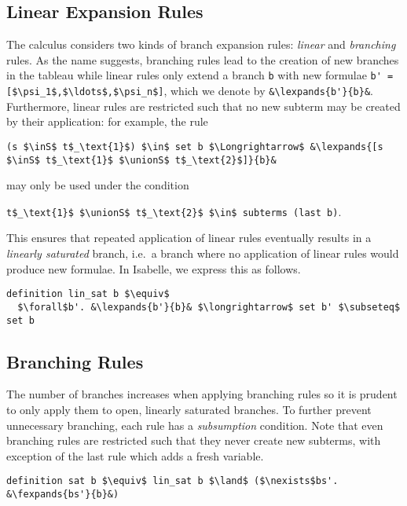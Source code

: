 \documentclass[sigplan,10pt,anonymous,review]{acmart}
\newcommand{\lefttrianglebar}{\mathrel{\tikz[baseline]{\draw (1ex, 0.75ex) -- (0, 1.25ex) -- (0, 0.25ex) -- cycle; \draw (0, 0.75ex) -- (1ex, 0.75ex);}}}
\newcommand{\lefttriangle}{\mathrel{\tikz[baseline]{\draw (1ex, 0.75ex) -- (0, 1.25ex) -- (0, 0.25ex) -- cycle;}}}
\newcommand{\lexpands}[2]{#1 $\lefttriangle$ #2}
\newcommand{\fexpands}[2]{#1 $\lefttrianglebar$ #2}
\newcommand{\unionS}{\sqcup_\text{s}}
\newcommand{\inS}{\in_\text{s}}
\begin{document}
\subsection{Linear Expansion Rules}
The calculus considers two kinds of branch expansion rules: \textit{linear} and \textit{branching} rules.
As the name suggests, branching rules lead to the creation of new branches in the tableau while linear rules only extend a branch \lstinline!b! with new formulae \lstinline[breaklines=true]!b' = [$\psi_1$,$\ldots$,$\psi_n$]!, which we denote by \lstinline!&\lexpands{b'}{b}&!.
Furthermore, linear rules are restricted such that no new subterm may be created by their application:
for example, the rule
\begin{center}
\lstinline!(s $\inS$ t$_\text{1}$) $\in$ set b $\Longrightarrow$ &\lexpands{[s $\inS$ t$_\text{1}$ $\unionS$ t$_\text{2}$]}{b}&!
\end{center}
may only be used under the condition
\begin{center}
  \lstinline!t$_\text{1}$ $\unionS$ t$_\text{2}$ $\in$ subterms (last b)!.
\end{center}
This ensures that repeated application of linear rules eventually results in a \textit{linearly saturated} branch, i.e.\ a branch where no application of linear rules would produce new formulae.
In Isabelle, we express this as follows.
\begin{lstlisting}
definition lin_sat b $\equiv$
  $\forall$b'. &\lexpands{b'}{b}& $\longrightarrow$ set b' $\subseteq$ set b
\end{lstlisting}

\subsection{Branching Rules\label{sec:branching}}
The number of branches increases when applying branching rules so it is prudent to only apply them to open, linearly saturated branches.
To further prevent unnecessary branching, each rule has a \textit{subsumption} condition. 
Note that even branching rules are restricted such that they never create new subterms, with exception of the last rule which adds a fresh variable.


\begin{lstlisting}
definition sat b $\equiv$ lin_sat b $\land$ ($\nexists$bs'. &\fexpands{bs'}{b}&)
\end{lstlisting}
\end{document}
